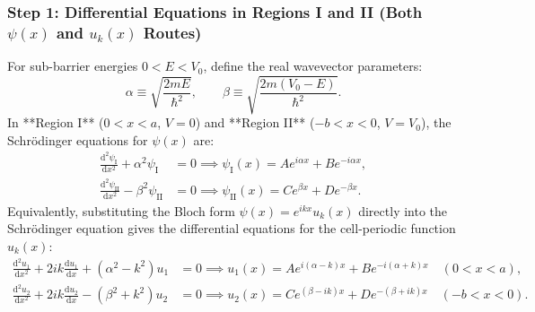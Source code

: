\documentclass[11pt,a4paper]{article}
\newcommand{\dv}[2]{\frac{\mathrm{d}#1}{\mathrm{d}#2}}
\newcommand{\dvtwo}[2]{\frac{\mathrm{d}^2#1}{\mathrm{d}#2^2}}
\newcommand{\hb}{\hbar}
\newcommand{\hbarsq}{\hb^2}
\begin{document}
\subsubsection{Step 1: Differential Equations in Regions I and II (Both $\psi(x)$ and $u_k(x)$ Routes)}
For sub-barrier energies $0 < E < V_0$, define the real wavevector parameters:
\begin{equation}
    \alpha \equiv \sqrt{\frac{2mE}{\hbarsq}}, \qquad \beta \equiv \sqrt{\frac{2m(V_0 - E)}{\hbarsq}}.
\end{equation}
In **Region I** ($0 < x < a$, $V=0$) and **Region II** ($-b < x < 0$, $V=V_0$), the Schr\"odinger equations for $\psi(x)$ are:
\begin{align}
    \dvtwo{\psi_{\mathrm{I}}}{x} + \alpha^2\psi_{\mathrm{I}} &= 0 \implies \psi_{\mathrm{I}}(x) = A e^{i\alpha x} + B e^{-i\alpha x}, \\
    \dvtwo{\psi_{\mathrm{II}}}{x} - \beta^2\psi_{\mathrm{II}} &= 0 \implies \psi_{\mathrm{II}}(x) = C e^{\beta x} + D e^{-\beta x}.
\end{align}
Equivalently, substituting the Bloch form $\psi(x) = e^{ikx}u_k(x)$ directly into the Schr\"odinger equation gives the differential equations for the cell-periodic function $u_k(x)$:
\begin{align}
    \dvtwo{u_1}{x} + 2ik\dv{u_1}{x} + (\alpha^2 - k^2)u_1 &= 0 \implies u_1(x) = A e^{i(\alpha-k)x} + B e^{-i(\alpha+k)x} \quad (0 < x < a), \\
    \dvtwo{u_2}{x} + 2ik\dv{u_2}{x} - (\beta^2 + k^2)u_2 &= 0 \implies u_2(x) = C e^{(\beta-ik)x} + D e^{-(\beta+ik)x} \quad (-b < x < 0).
\end{align}
\end{document}
